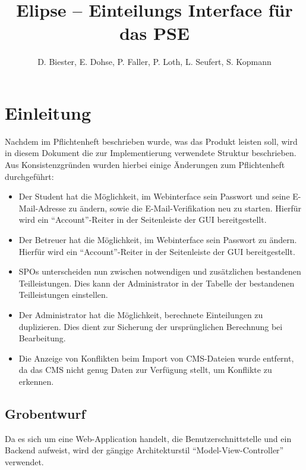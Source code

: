 \documentclass[parskip=full]{scrartcl}
\begin{document}
\title{Elipse -- Einteilungs Interface für das PSE}
\author{D. Biester, E. Dohse, P. Faller, P. Loth, L. Seufert, S. Kopmann}
\zweitgutachter{}

\mytitlepage

\tableofcontents
\pagebreak

\section{Einleitung}
Nachdem im Pflichtenheft beschrieben wurde, was das Produkt leisten soll, wird in
diesem Dokument die zur Implementierung verwendete Struktur beschrieben. Aus
Konsistenzgründen wurden hierbei einige Änderungen zum Pflichtenheft
durchgeführt:
\begin{itemize}
  \item Der Student hat die Möglichkeit, im Webinterface sein Passwort und seine
  E-Mail-Adresse zu ändern, sowie die E-Mail-Verifikation neu zu starten.
  Hierfür wird ein \enquote{Account}-Reiter in der Seitenleiste der GUI
  bereitgestellt.
  \item Der Betreuer hat die Möglichkeit, im Webinterface sein Passwort zu
  ändern. Hierfür wird ein \enquote{Account}-Reiter in der Seitenleiste der GUI
  bereitgestellt.
  \item SPOs unterscheiden nun zwischen notwendigen und zusätzlichen bestandenen
  Teilleistungen. Dies kann der Administrator in der Tabelle der bestandenen
  Teilleistungen einstellen.
  \item Der Administrator hat die Möglichkeit, berechnete Einteilungen zu
  duplizieren. Dies dient zur Sicherung der ursprünglichen Berechnung bei
  Bearbeitung.
  \item Die Anzeige von Konflikten beim Import von CMS-Dateien wurde entfernt,
  da das CMS nicht genug Daten zur Verfügung stellt, um Konflikte zu erkennen.
\end{itemize}
\subsection{Grobentwurf}
Da es sich um eine Web-Application handelt, die Benutzerschnittstelle und ein
Backend aufweist, wird der gängige Architekturstil \enquote{Model-View-Controller}
verwendet.
\end{document}
